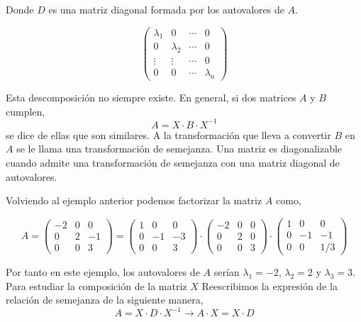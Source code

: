 Donde $D$ es una matriz diagonal formada por los autovalores de $A$. 

\begin{equation*}
\begin{pmatrix}
\lambda_1& 0 & \cdots & 0\\
0& \lambda_2& \cdots & 0\\
\vdots & \vdots& \cdots & 0\\
0& 0& \cdots & \lambda_n
\end{pmatrix}
\end{equation*}

Esta descomposición no siempre existe. En general, si dos matrices $A$ y $B$ cumplen,
\begin{equation*}
A=X\cdot B \cdot X^{-1}
\end{equation*}
se dice de ellas que son similares. A la transformación que lleva a convertir $B$ en $A$ se le llama una transformación de semejanza. Una matriz es diagonalizable cuando admite una transformación de semejanza con una matriz diagonal de autovalores. 

Volviendo al ejemplo anterior podemos factorizar la matriz $A$ como,

\begin{equation*}
A= \begin{pmatrix}
-2& 0& 0\\
0& 2 & -1\\
0& 0& 3
\end{pmatrix}=\begin{pmatrix}
1& 0& 0\\
0& -1& -3\\
0& 0& 3
\end{pmatrix}\cdot \begin{pmatrix}
-2& 0& 0\\
0& 2& 0\\
0& 0& 3
\end{pmatrix} \cdot \begin{pmatrix}
1& 0& 0\\
0& -1& -1\\
0& 0& 1/3
\end{pmatrix}
\end{equation*}

Por tanto en este ejemplo, los autovalores de $A$ serían $\lambda_1=-2$, $\lambda_2=2$ y $\lambda_3=3$. Para estudiar la composición de la matriz $X$ Reescribimos la expresión de la relación de semejanza de la siguiente manera,
\begin{equation*}
 A=X \cdot D \cdot X^{-1}\rightarrow A\cdot X= X\cdot D
\end{equation*}

